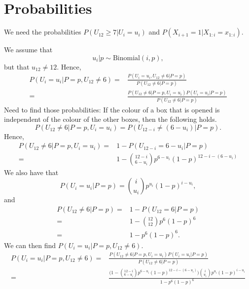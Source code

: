 \documentclass{article}
\begin{document}
\newpage
\section{Probabilities}
We need the probabilities $P(U_{12} \geq 7|U_i=u_i)$ and $P(X_{i+1}=1|X_{1:i}=x_{1:i})$.

We assume that
\begin{equation*}
    u_i|p \sim \text{Binomial}(i,p),
\end{equation*}
but that $u_{12} \neq 12$. Hence,
\begin{equation*}
    \begin{aligned}
    P(U_i=u_i|P=p, U_{12}\neq6) 
    = &\frac{P(U_i=u_i,U_{12}\neq6|P=p)}{P(U_{12}\neq6|P=p)}\\[6pt]
    = &\frac{P(U_{12}\neq6|P=p,U_i=u_i)P(U_i=u_i|P=p)}{P(U_{12}\neq6|P=p)}
    \end{aligned}
\end{equation*}
Need to find those probabilities:
If the colour of a box that is opened is independent of the colour of the other boxes, then the following holds. 
\begin{equation*}
    P(U_{12}\neq6|P=p,U_i=u_i) = P(U_{12-i}\neq(6-u_i)|P=p).
\end{equation*}
Hence,
\begin{equation*}
    \begin{aligned}
        P(U_{12}\neq6|P=p,U_i=u_i) 
        =& 1 - P(U_{12-i}=6-u_i|P=p) \\[6pt]
        =& 1 - \binom{12-i}{6-u_i}p^{6-u_i}(1-p)^{12-i-(6-u_i)}
    \end{aligned}
\end{equation*}
We also have that
\begin{equation*}
    P(U_i=u_i|P=p)=\binom{i}{u_i}p^{u_i}(1-p)^{i-u_i},
\end{equation*}
and 
\begin{equation*}
    \begin{aligned}
        P(U_{12}\neq6|P=p)
        =& 1-P(U_{12}=6|P=p)\\[6pt]
        =& 1-\binom{12}{12}p^6(1-p)^6\\[6pt]
        =& 1-p^6(1-p)^6.
    \end{aligned}
\end{equation*}
We can then find $P(U_i=u_i|P=p, U_{12}\neq6)$.
\begin{equation*}
    \begin{aligned}
        P(U_i=u_i|P=p, U_{12}\neq6) 
        = &\frac{P(U_{12}\neq6|P=p,U_i=u_i)P(U_i=u_i|P=p)}{P(U_{12}\neq6|P=p)}\\[6pt]
        = & \frac{\Big(1 - \binom{12-i}{6-u_i}p^{6-u_i}(1-p)^{12-i-(6-u_i)}\Big)\binom{i}{u_i}p^{u_i}(1-p)^{i-u_i}}{1-p^6(1-p)^6}
    \end{aligned}
\end{equation*}
\end{document}
